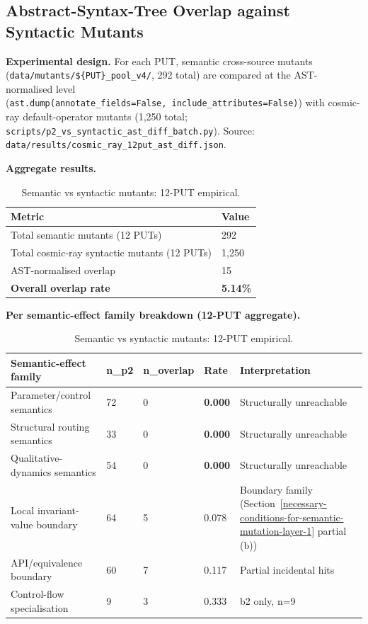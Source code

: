 \documentclass[manuscript,screen,review]{acmart}
\begin{document}
\subsection{Abstract-Syntax-Tree Overlap against Syntactic Mutants}\label{p2-vs-syntactic-mutants-12-put-empirical-layer-3}

\textbf{Experimental design.} For each PUT, semantic cross-source mutants
(\texttt{data/mutants/\$\{PUT\}\_pool\_v4/}, 292 total) are compared at
the AST-normalised level
(\texttt{ast.dump(annotate\_fields=False,\ include\_attributes=False)})
with cosmic-ray default-operator mutants (1,250 total;
\texttt{scripts/p2\_vs\_syntactic\_ast\_diff\_batch.py}). Source:
\texttt{data/results/cosmic\_ray\_12put\_ast\_diff.json}.

\textbf{Aggregate results.}

{%
\begin{longtable}[]{@{}ll@{}}
\caption{Semantic vs syntactic mutants: 12-PUT empirical.}\label{tab:p2-04}\\
\toprule\noalign{}
Metric & Value \\
\midrule\noalign{}
\endfirsthead
\endhead
\bottomrule\noalign{}
\endlastfoot
Total semantic mutants (12 PUTs) & 292 \\
Total cosmic-ray syntactic mutants (12 PUTs) & 1,250 \\
AST-normalised overlap & 15 \\
\textbf{Overall overlap rate} & \textbf{5.14\%} \\
\end{longtable}
}

\textbf{Per semantic-effect family breakdown (12-PUT aggregate).}

{%
\begin{longtable}[]{@{}lllll@{}}
\caption{Semantic vs syntactic mutants: 12-PUT empirical.}\label{tab:p2-05}\\
\toprule\noalign{}
Semantic-effect family & n\_p2 & n\_overlap & Rate & Interpretation \\
\midrule\noalign{}
\endfirsthead
\endhead
\bottomrule\noalign{}
\endlastfoot
Parameter/control semantics & 72 & 0 & \textbf{0.000} & Structurally unreachable \\
Structural routing semantics & 33 & 0 & \textbf{0.000} & Structurally unreachable \\
Qualitative-dynamics semantics & 54 & 0 & \textbf{0.000} & Structurally unreachable \\
Local invariant-value boundary & 64 & 5 & 0.078 & Boundary family (Section~\ref{necessary-conditions-for-semantic-mutation-layer-1} partial (b)) \\
API/equivalence boundary & 60 & 7 & 0.117 & Partial incidental hits \\
Control-flow specialisation & 9 & 3 & 0.333 & b2 only, n=9 \\
\end{longtable}
}
\end{document}
